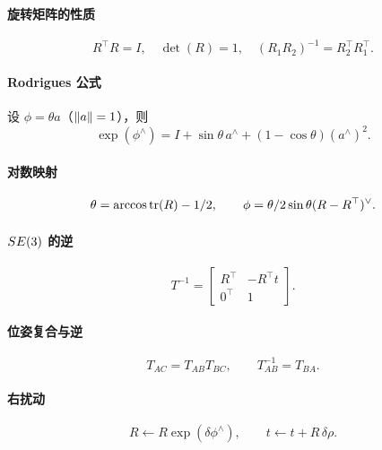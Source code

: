 \paragraph{旋转矩阵的性质}
\begin{equation}
R^{\top}R=I,\quad \det(R)=1,\quad (R_1R_2)^{-1}=R_2^{\top}R_1^{\top}.
\end{equation}

\paragraph{Rodrigues 公式}
设 $\phi=\theta a$（$\left\lVert a \right\rVert=1$），则
\begin{equation}
\exp(\phi^{\wedge})=I+\sin\theta\,a^{\wedge}+(1-\cos\theta)(a^{\wedge})^{2}.
\end{equation}

\paragraph{对数映射}
\begin{equation}
\theta=\arccos\operatorname{tr}(R)-1/2,\qquad
\phi=\theta/2\sin\theta(R-R^{\top})^{\vee}.
\end{equation}

\paragraph{$SE(3)$ 的逆}
\begin{equation}
T^{-1}=\begin{bmatrix}R^{\top}&-R^{\top}t\\0^{\top}&1\end{bmatrix}.
\end{equation}

\paragraph{位姿复合与逆}
\begin{equation}
T_{AC}=T_{AB}T_{BC},\qquad
T_{AB}^{-1}=T_{BA}.
\end{equation}

\paragraph{右扰动}
\begin{equation}
R\leftarrow R\exp(\delta\phi^{\wedge}),\qquad t\leftarrow t+R\,\delta\rho.
\end{equation}

